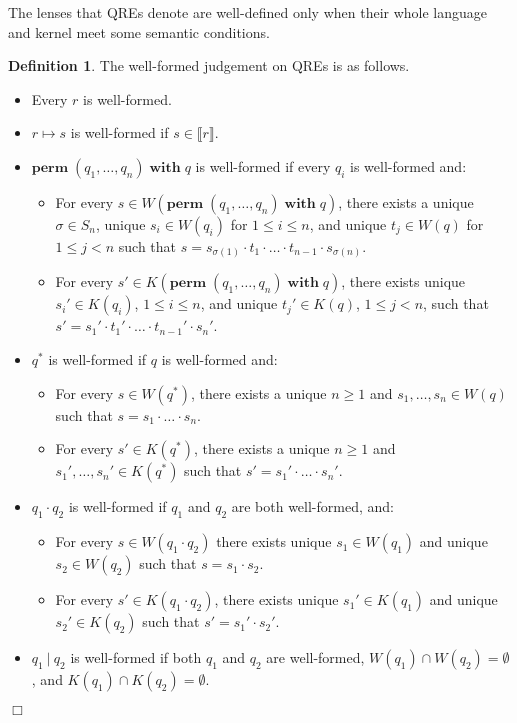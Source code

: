 \documentclass[a4paper,11pt] {article}
\theoremstyle{definition}
\newtheorem{definition}[theorem]{Definition}
\newcommand{\perm}{ \textbf{perm}\; }
\newcommand{\with}{ \;\textbf{with}\; }
\begin{document}
The lenses that QREs denote are well-defined only when their whole
language and kernel meet some semantic conditions.
\begin{definition}
The well-formed judgement on QREs is as follows.
\begin{itemize}
\item Every $r$ is well-formed.
\item $r \mapsto s$ is well-formed if $s \in \llbracket r \rrbracket$.
\item $\perm(q_1, \ldots, q_n) \with q$ is well-formed if every $q_i$ is
  well-formed and:
  \begin{itemize}
  \item For every 
    $s \in W(\perm(q_1, \ldots, q_n) \with q)$, there exists a unique
    $\sigma \in S_n$, unique $s_i \in W(q_i)$ for $1 \leq i \leq n$,
    and unique $t_j \in W(q)$ for $1 \leq j < n$ such that 
    $s = s_{\sigma(1)} \cdot t_1 \cdot \ldots \cdot t_{n-1} \cdot
    s_{\sigma(n)}$.
    
  \item For every $s' \in K(\perm(q_1, \ldots, q_n) \with q)$, there exists
    unique $s_i' \in K(q_i)$, $1 \leq i \leq n$, and unique
    $t_j' \in K(q)$, $1 \leq j < n$, 
    such that $s' = s_1' \cdot t_1' \cdot \ldots \cdot t_{n-1}' \cdot s_n'$.
  \end{itemize}
  
  
\item $q^*$ is well-formed if $q$ is well-formed and:
  \begin{itemize}
  \item For every $s \in W(q^*)$, there exists a unique $n \geq 1$ and
    $s_1, \ldots, s_n \in W(q)$ such that $s = s_1 \cdot \ldots \cdot
    s_n$.
  \item For every $s' \in K(q^*)$, there exists a unique $n \geq 1$ and
    $s_1', \ldots, s_n' \in K(q^*)$ such that
    $s' = s_1' \cdot \ldots \cdot s_n'$.
  \end{itemize}
\item $q_1 \cdot q_2$ is well-formed if $q_1$ and $q_2$ are both well-formed,
  and:
  \begin{itemize}
  \item For every $s \in W(q_1 \cdot q_2)$ there exists unique $s_1 \in W(q_1)$
    and unique $s_2 \in W(q_2)$ such that 
    $s = s_1 \cdot s_2$.
  \item For every $s' \in K(q_1 \cdot q_2)$, there exists unique $s_1' \in K(q_1)$
    and unique $s_2' \in K(q_2)$ such that
    $s' = s_1' \cdot s_2'$.
  \end{itemize}
  
\item $q_1 ~|~ q_2$ is well-formed if both $q_1$ and $q_2$ are well-formed,
  $W(q_1) \cap W(q_2) = \emptyset$, and $K(q_1) \cap K(q_2) = \emptyset$.
\end{itemize}
\begin{flushright} $\Box$ \end{flushright}
\end{definition}
\end{document}
